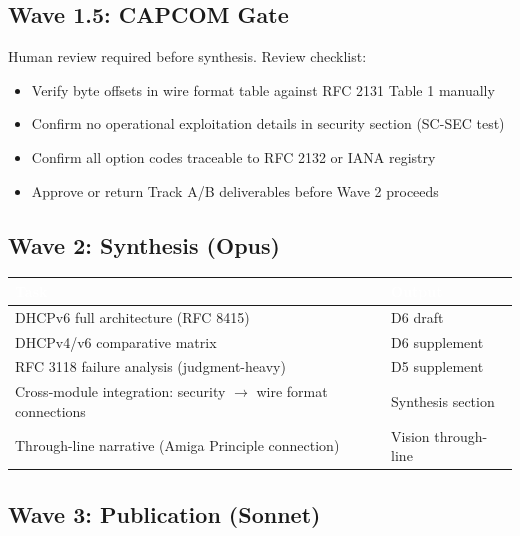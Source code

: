 \documentclass[11pt,letterpaper]{article}
\newcommand{\tableheader}[1]{\textbf{\sffamily\textcolor{white}{#1}}}
\begin{document}
\subsection{Wave 1.5: CAPCOM Gate}

Human review required before synthesis. Review checklist:
\begin{itemize}[noitemsep]
  \item Verify byte offsets in wire format table against RFC 2131 Table 1 manually
  \item Confirm no operational exploitation details in security section (SC-SEC test)
  \item Confirm all option codes traceable to RFC 2132 or IANA registry
  \item Approve or return Track A/B deliverables before Wave 2 proceeds
\end{itemize}

\subsection{Wave 2: Synthesis (Opus)}

\begin{center}
\begin{tabularx}{\textwidth}{L{4.5cm}X}
\toprule
{}
\tableheader{Task} & \tableheader{Output} \\
\midrule
DHCPv6 full architecture (RFC 8415) & D6 draft \\
DHCPv4/v6 comparative matrix & D6 supplement \\
RFC 3118 failure analysis (judgment-heavy) & D5 supplement \\
Cross-module integration: security $\to$ wire format connections & Synthesis section \\
Through-line narrative (Amiga Principle connection) & Vision through-line \\
\bottomrule
\end{tabularx}
\end{center}

\subsection{Wave 3: Publication (Sonnet)}
\end{document}
